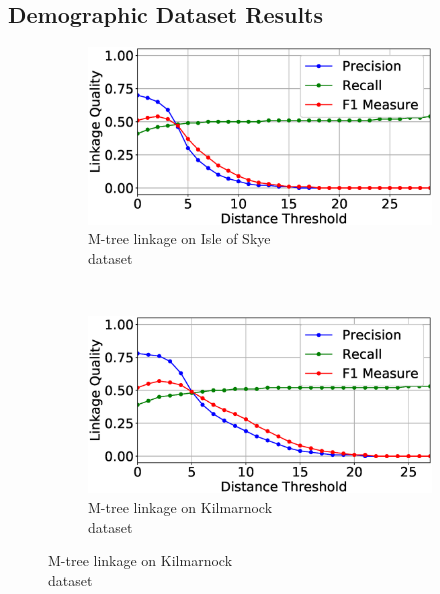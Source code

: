 \documentclass{llncs}
\begin{document}

\subsection{Demographic Dataset Results}

\begin{figure}[t]
\centering
\begin{subfigure}{.46\textwidth}
  \centering
\includegraphics[width=\textwidth]{figures/plotLQ-skye-mtree}
\vspace{-6mm}
\caption{M-tree linkage on Isle of Skye \\ dataset\label{skye-quality-mtree}}
\end{subfigure}%
~~
\begin{subfigure}{.46\textwidth}
  \centering
\includegraphics[width=\textwidth]{figures/plotLQ-kilmarnock-mtree}
\vspace{-6mm}
\caption{M-tree linkage on Kilmarnock \\ dataset \label{kilmarnock-quality-mtree}}
\end{subfigure} \vspace{1mm}


\end{figure}
\end{document}
